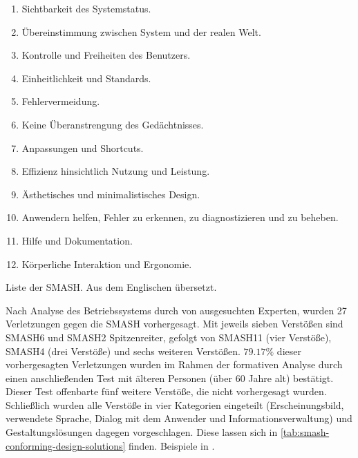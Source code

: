 \begin{table}[H]
	\begin{enumerate}[label={SMASH\arabic*.},leftmargin=7em,nosep]
		\item Sichtbarkeit des Systemstatus.
		\item Übereinstimmung zwischen System und der realen Welt.
		\item Kontrolle und Freiheiten des Benutzers.
		\item Einheitlichkeit und Standards.
		\item Fehlervermeidung.
		\item Keine Überanstrengung des Gedächtnisses.
		\item Anpassungen und Shortcuts.
		\item Effizienz hinsichtlich Nutzung und Leistung.
		\item Ästhetisches und minimalistisches Design.
		\item Anwendern helfen, Fehler zu erkennen, zu diagnostizieren und zu beheben.	
		\item Hilfe und Dokumentation.
		\item Körperliche Interaktion und Ergonomie.
	\end{enumerate}
	\caption{\label{tab:smash-list}Liste der \acf{SMASH}\cite{Inostroza:2016:Developing-SMASH:-A-set-of-SMArtphones}. Aus dem Englischen übersetzt.}
\end{table}


Nach Analyse des Betriebssystems durch von \citeauthor{Salman:2018:Usability-Evaluation-of-the-Smartphone} ausgesuchten Experten, wurden 27 Verletzungen gegen die \ac{SMASH} vorhergesagt. Mit jeweils sieben Verstößen sind SMASH6 und SMASH2 Spitzenreiter, gefolgt von SMASH11 (vier Verstöße), SMASH4 (drei Verstöße) und sechs weiteren Verstößen. $ 79.17 \% $ dieser vorhergesagten Verletzungen wurden im Rahmen der formativen Analyse durch einen anschließenden Test mit älteren Personen (über 60 Jahre alt) bestätigt. Dieser Test offenbarte fünf weitere Verstöße, die nicht vorhergesagt wurden. Schließlich wurden alle Verstöße in vier Kategorien eingeteilt (Erscheinungsbild, verwendete Sprache, Dialog mit dem Anwender und Informationsverwaltung) und Gestaltungslösungen dagegen vorgeschlagen. Diese lassen sich in \autoref{tab:smash-conforming-design-solutions} finden. Beispiele in \cite{Salman:2018:Usability-Evaluation-of-the-Smartphone}.

